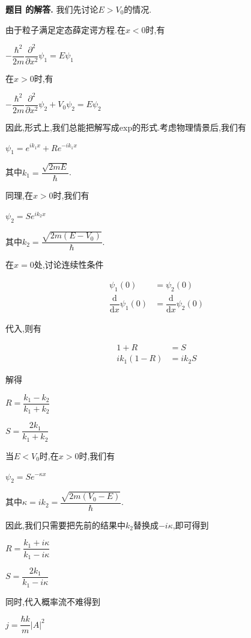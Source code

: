 \documentclass[12pt, a4paper, oneside]{ctexart}
\newcounter{problemname}
\newenvironment{solution}
  {\par\noindent\textbf{题目 \theproblemname 的解答. }}
  {\par}
\begin{document}
\begin{solution}
  我们先讨论$E>V_0$的情况.

  由于粒子满足定态薛定谔方程.在$x<0$时,有

  \centerline{$-\dfrac{\hbar^2}{2m} \dfrac{\partial^2}{\partial x^2} \psi_{1} = E \psi_{1}$}

  在$x>0$时,有

  \centerline{$-\dfrac{\hbar^2}{2m} \dfrac{\partial^2}{\partial x^2} \psi_{2} +V_0 \psi_2= E \psi_{2}$}

  因此,形式上,我们总能把解写成exp的形式.考虑物理情景后,我们有

  \centerline{$\psi_1 = e^{ik_1 x} + R e^{-ik_1 x}$}

  其中$k_1 = \dfrac{\sqrt{2mE}}{\hbar}$.

  同理,在$x>0$时,我们有

  \centerline{$\psi_2 = S e^{ik_2 x}$}

  其中$k_2 = \dfrac{\sqrt{2m(E-V_0)}}{\hbar}$.

  在$x=0$处,讨论连续性条件

  \begin{align*}
    \psi_1(0) &= \psi_2(0) \\
    \dfrac{\mathrm{d}}{\mathrm{d}x} \psi_1(0) &= \dfrac{\mathrm{d}}{\mathrm{d}x} \psi_2(0)
  \end{align*}

  代入,则有

  \begin{align*}
    1 + R &= S \\
    ik_1 (1 - R) &= ik_2 S
  \end{align*}

  解得

  \centerline{$R = \dfrac{k_1 - k_2}{k_1 + k_2}$}

  \centerline{$S = \dfrac{2k_1}{k_1 + k_2}$}

  当$E<V_0$时,在$x>0$时,我们有

  \centerline{$\psi_2 = S e^{-\kappa x}$}

  其中$\kappa = ik_2 = \dfrac{\sqrt{2m(V_0 - E)}}{\hbar}$.

  因此,我们只需要把先前的结果中$k_2$替换成$-i \kappa$,即可得到

  \centerline{$R = \dfrac{k_1 + i\kappa}{k_1 - i\kappa}$}

  \centerline{$S = \dfrac{2k_1}{k_1 - i\kappa}$}

  同时,代入概率流不难得到

  \centerline{$j = \dfrac{\hbar k}{m} |A|^2$}


\end{solution}
\end{document}
